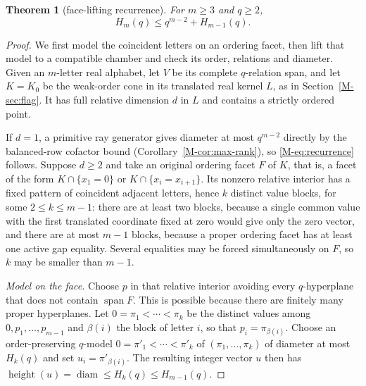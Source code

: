 \documentclass[11pt,reqno]{amsart}
\theoremstyle{plain}
\newtheorem{theorem}{Theorem}[section]
\theoremstyle{definition}
\theoremstyle{plain}
\newcommand{\height}{\operatorname{height}}
\newcommand{\diam}{\operatorname{diam}}
\newcommand{\spn}{\operatorname{span}}
\theoremstyle{plain}
\theoremstyle{plain}
\theoremstyle{plain}
\theoremstyle{plain}
\theoremstyle{plain}
\theoremstyle{definition}
\theoremstyle{definition}
\theoremstyle{definition}
\theoremstyle{plain}
\begin{document}
\begin{theorem}[face-lifting recurrence]\label{M-thm:lifting}
For $m\ge3$ and $q\ge2$,
\begin{equation}\label{M-eq:recurrence}
 H_m(q)\le q^{m-2}+H_{m-1}(q).
\end{equation}
\end{theorem}
\begin{proof}
We first model the coincident letters on an ordering facet, then lift
that model to a compatible chamber and check its order, relations and diameter.
Given an $m$-letter real alphabet, let $V$ be its complete $q$-relation span,
and let $K=K_0$ be the weak-order cone in its translated real kernel $L$, as
in Section~\ref{M-sec:flag}. It has full relative dimension $d$ in $L$ and
contains a strictly ordered point.

If $d=1$, a primitive ray generator gives diameter at most $q^{m-2}$ directly
by the balanced-row cofactor bound (Corollary~\ref{M-cor:max-rank}), so
\eqref{M-eq:recurrence} follows. Suppose $d\ge2$ and take an original ordering
facet $F$ of $K$, that is, a facet of the form $K\cap\{x_1=0\}$ or
$K\cap\{x_i=x_{i+1}\}$. Its nonzero relative interior has a fixed pattern of
coincident adjacent letters, hence $k$ distinct value blocks, for some
$2\le k\le m-1$: there are at least two blocks, because a single common value
with the first translated coordinate fixed at zero would give only the zero
vector, and there are at most $m-1$ blocks, because a proper ordering facet
has at least one active gap equality. Several equalities may be forced
simultaneously on $F$, so $k$ may be smaller than $m-1$.

\smallskip\noindent\emph{Model on the face.}
Choose $p$ in that relative interior avoiding every $q$-hyperplane that does
not contain $\spn F$. This is possible because there are finitely many
proper hyperplanes. Let $0=\pi_1<\cdots<\pi_k$ be the distinct values among
$0,p_1,\ldots,p_{m-1}$ and $\beta(i)$ the block of letter $i$, so that
$p_i=\pi_{\beta(i)}$. Choose an order-preserving $q$-model
$0=\pi'_1<\cdots<\pi'_k$ of $(\pi_1,\ldots,\pi_k)$ of diameter at most
$H_k(q)$ and set $u_i=\pi'_{\beta(i)}$. The resulting integer vector $u$
then has $\height(u)=\diam\le H_k(q)\le H_{m-1}(q)$.


\end{proof}
\end{document}
